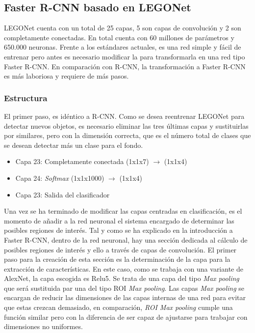 \subsection{Faster R-CNN basado en LEGONet}
LEGONet cuenta con un total de 25 capas, 5 son capas de convolución y 2 son completamente conectadas. En total cuenta con 60 millones de parámetros y 650.000 neuronas. Frente a los estándares actuales, es una red simple y fácil de entrenar pero antes es necesario modificar la para transformarla en una red tipo Faster R-CNN. En comparación con R-CNN, la transformación a Faster R-CNN es más laboriosa y requiere de más pasos.

\subsubsection*{Estructura}
\label{subsubsec: Faster R-CNN estructura}
El primer paso, es idéntico a R-CNN. Como se desea reentrenar LEGONet para detectar nuevos objetos, es necesario eliminar las tres últimas capas y sustituirlas por similares, pero con la dimensión correcta, que es el número total de clases que se desean detectar más un clase para el fondo.

\begin{itemize}
\item Capa 23: Completamente conectada (1x1x7) $\rightarrow$ (1x1x4)
\item Capa 24: \textit{Softmax} (1x1x1000) $\rightarrow$ (1x1x4)
\item Capa 23: Salida del clasificador
\end{itemize}

Una vez se ha terminado de modificar las capas centradas en clasificación, es el momento de añadir a la red neuronal el sistema encargado de determinar las posibles regiones de interés. Tal y como se ha explicado en la introducción a Faster R-CNN, dentro de la red neuronal, hay una sección dedicada al cálculo de posibles regiones de interés y ello a través de capas de convolución. El primer paso para la creación de esta sección es la determinación de la capa para la extracción de características. En este caso, como se trabaja con una variante de AlexNet, la capa escogida es Relu5. Se trata de una capa del tipo \textit{Max pooling} que será sustituida par una del tipo ROI \textit{Max pooling}. Las capas \textit{Max pooling} se encargan de reducir las dimensiones de las capas internas de una red para evitar que estas crezcan demasiado, en comparación, \textit{ROI Max pooling} cumple una función similar pero con la diferencia de ser capaz de ajustarse para trabajar con dimensiones no uniformes.

